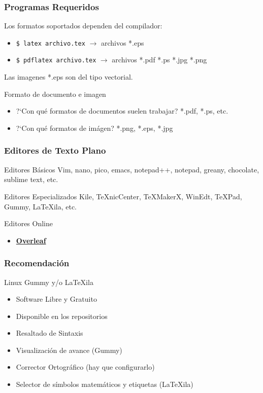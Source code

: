 \documentclass[aspectratio=1610]{beamer}%
\begin{document}
\begin{frame}[fragile]
\frametitle{\textbf{Programas Requeridos}}
\justifying
 Los formatos soportados dependen del compilador:
 \begin{itemize}\justifying
  \item \verb+$ latex archivo.tex+ $\rightarrow$ archivos *.eps
  \item \verb+$ pdflatex archivo.tex+ $\rightarrow$ archivos *.pdf *.ps *.jpg *.png
\end{itemize}
Las imagenes *.eps son del tipo vectorial.
\begin{block}{Formato de documento e imagen}
\begin{itemize}\justifying
  \item ?`Con qué formatos de documentos suelen trabajar? *.pdf, *.ps, etc.
  \item ?`Con qué formatos de imágen? *.png, *.eps, *.jpg
\end{itemize}

\end{block}

\end{frame}

\begin{frame}[fragile]
\frametitle{\textbf{Editores de Texto Plano}}
\justifying
 \begin{block}{Editores Básicos}
Vim, nano, pico, emacs, notepad++, notepad, greany, chocolate, sublime text, etc.
\end{block}

\begin{block}{Editores Especializados}
Kile, \TeX{}nicCenter, \TeX{}MakerX, WinEdt, \TeX{}Pad, Gummy, \LaTeX{}ila, etc.
\end{block}


\begin{block}{Editores Online}
\begin{itemize}\justifying
  \item \href{https://www.overleaf.com?r=3e23a01e&rm=d&rs=b}{\textbf{Overleaf}}
\end{itemize}

\end{block}
\end{frame}

\begin{frame}[fragile]
\frametitle{\textbf{Recomendación}}
\justifying
 \begin{block}{Linux}
Gummy y/o \LaTeX{}ila
\begin{itemize}\justifying
  \item Software Libre y Gratuito
  \item Disponible en los repositorios
  \item Resaltado de Sintaxis
  \item Visualización de avance (Gummy)
  \item Corrector Ortográfico (hay que configurarlo)
  \item Selector de símbolos matemáticos y etiquetas (\LaTeX{}ila)
\end{itemize}
\end{block}
\end{frame}
\end{document}
